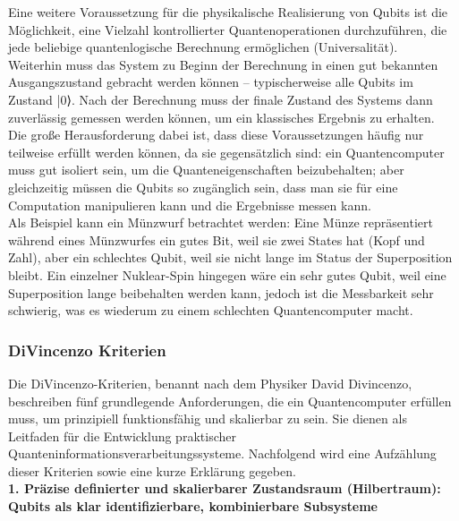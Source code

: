  Eine weitere Voraussetzung für die physikalische Realisierung von Qubits ist die Möglichkeit, eine Vielzahl kontrollierter Quantenoperationen durchzuführen, die jede beliebige quantenlogische Berechnung ermöglichen (Universalität).\\
 
 Weiterhin  muss das System zu Beginn der Berechnung in einen gut bekannten Ausgangszustand gebracht werden können – typischerweise alle Qubits im Zustand |0⟩. Nach der Berechnung muss der finale Zustand des Systems dann zuverlässig gemessen werden können, um ein klassisches Ergebnis zu erhalten. \\

Die große Herausforderung dabei ist, dass diese Voraussetzungen häufig nur teilweise erfüllt werden können, da sie gegensätzlich sind: ein Quantencomputer muss gut isoliert sein, um die Quanteneigenschaften beizubehalten; aber gleichzeitig müssen die Qubits so zugänglich sein, dass man sie für eine Computation manipulieren kann und die Ergebnisse messen kann. \\
Als Beispiel kann ein Münzwurf betrachtet werden: Eine Münze repräsentiert während eines Münzwurfes ein gutes Bit, weil sie zwei States hat (Kopf und Zahl), aber ein schlechtes Qubit, weil sie nicht lange im Status der Superposition bleibt. Ein einzelner Nuklear-Spin hingegen wäre ein sehr gutes Qubit, weil eine Superposition lange beibehalten werden kann, jedoch ist die Messbarkeit sehr schwierig, was es wiederum zu einem schlechten Quantencomputer macht.  \\

\cite{nielsen_quantum_2010}


\subsubsection{DiVincenzo Kriterien}

Die DiVincenzo-Kriterien, benannt nach dem Physiker David Divincenzo, beschreiben fünf grundlegende Anforderungen, die ein Quantencomputer erfüllen muss, um prinzipiell funktionsfähig und skalierbar zu sein. Sie dienen als Leitfaden für die Entwicklung praktischer Quanteninformationsverarbeitungssysteme. Nachfolgend wird eine Aufzählung dieser Kriterien sowie eine kurze Erklärung gegeben. \\

\textbf{1. Präzise definierter und skalierbarer Zustandsraum (Hilbertraum): Qubits als klar identifizierbare, kombinierbare Subsysteme} 

